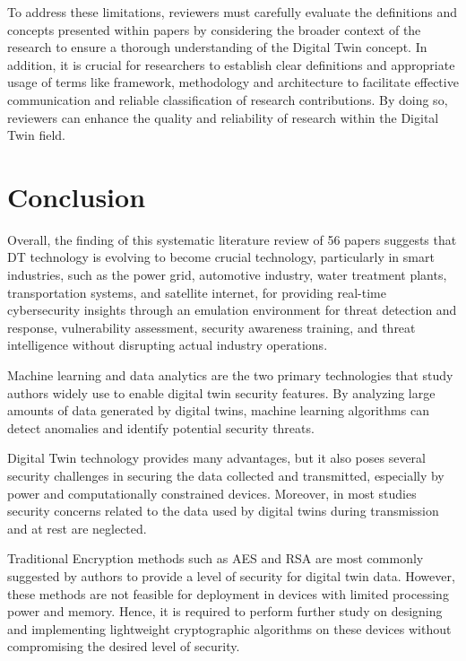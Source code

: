  To address these limitations, reviewers must carefully evaluate the definitions and concepts presented within papers by considering the broader context of the research to ensure a thorough understanding of the Digital Twin concept. In addition, it is crucial for researchers to establish clear definitions and appropriate usage of terms like framework, methodology and architecture to facilitate effective communication and reliable classification of research contributions. By doing so, reviewers can enhance the quality and reliability of research within the Digital Twin field.


\section{Conclusion}
Overall, the finding of this systematic literature review of 56 papers suggests that DT technology is evolving to become crucial technology, particularly in smart industries, such as the power grid, automotive industry, water treatment plants, transportation systems, and satellite internet, for providing real-time cybersecurity insights through an emulation environment for threat detection and response, vulnerability assessment, security awareness training, and threat intelligence without disrupting actual industry operations. 

Machine learning and data analytics are the two primary technologies that study authors widely use to enable digital twin security features. By analyzing large amounts of data generated by digital twins, machine learning algorithms can detect anomalies and identify potential security threats.

Digital Twin technology provides many advantages, but it also poses several security challenges in securing the data collected and transmitted, especially by power and computationally constrained devices. Moreover, in most studies security concerns related to the data used by digital twins during transmission and at rest are neglected.

Traditional Encryption methods such as AES and RSA are most commonly suggested by authors to provide a level of security for digital twin data. However, these methods are not feasible for deployment in devices with limited processing power and memory. Hence, it is required to perform further study on designing and implementing lightweight cryptographic algorithms on these devices without compromising the desired level of security. 



